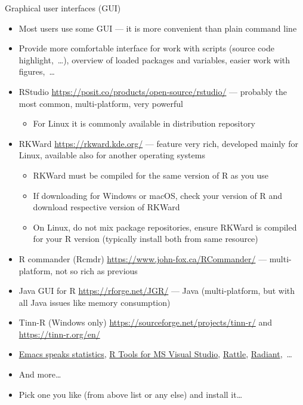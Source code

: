 \documentclass[compress, xelatex, 11pt, xcolor=svgnames, aspectratio=169,
	hyperref={
		bookmarks=true,
		unicode=true,
		colorlinks=true,
		pdftitle={Molecular data in R},
		plainpages=false,
		pdfauthor={Vojtech Zeisek},
		pdfsubject={Course about phylogeny and evolution in R},
		pdfcreator={XeLaTeX},
		pdfkeywords={R, evolution, phylogeny, molecular data},
		linkcolor=Crimson, %
		anchorcolor=Magenta, %
		citecolor=Magenta, %
		filecolor=Magenta, %
		menucolor=Magenta, %
		urlcolor=DodgerBlue, %
		},
	url={hyphens, lowtilde} %
	]{beamer}
\begin{document}
\begin{frame}[allowframebreaks]{Graphical user interfaces (GUI)}
	\label{gui}
	\begin{itemize}
		\item Most users use some GUI --- it is more convenient than plain command line
		\item Provide more comfortable interface for work with scripts (source code highlight,~\ldots), overview of loaded packages and variables, easier work with figures,~\ldots
		\item RStudio \url{https://posit.co/products/open-source/rstudio/} --- probably the most common, multi-platform, very powerful
		\begin{itemize}
			\item For Linux it is commonly available in distribution repository
		\end{itemize}
		\item RKWard \url{https://rkward.kde.org/} --- feature very rich, developed mainly for Linux, available also for another operating systems
		\begin{itemize}
			\item RKWard must be compiled for the same version of R as you use
			\item If downloading for Windows or macOS, check your version of R and download respective version of RKWard
			\item On Linux, do not mix package repositories, ensure RKWard is compiled for your R version (typically install both from same resource)
		\end{itemize}
		\item R commander (Rcmdr) \url{https://www.john-fox.ca/RCommander/} --- multi-platform, not so rich as previous
		\item Java GUI for R \url{https://rforge.net/JGR/} --- Java (multi-platform, but with all Java issues like memory consumption)
		\item Tinn-R (Windows only) \url{https://sourceforge.net/projects/tinn-r/} and \url{https://tinn-r.org/en/}
		\item \href{https://ess.r-project.org/}{Emacs speaks statistics}, \href{https://code.visualstudio.com/docs/languages/r}{R Tools for MS Visual Studio}, \href{https://rattle.togaware.com/}{Rattle}, \href{https://radiant-rstats.github.io/docs/}{Radiant},~\ldots
		\item And more\ldots
		\item Pick one you like (from above list or any else) and install it\ldots
	\end{itemize}
\end{frame}
\end{document}

